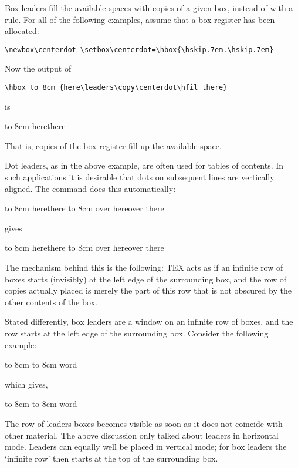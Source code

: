 Box leaders fill the available spaces with copies of a given box, instead of with a rule.
For all of the following examples, assume that a box register has been allocated:

\verb+\newbox\centerdot \setbox\centerdot=\hbox{\hskip.7em.\hskip.7em}+

Now the output of

\verb+\hbox to 8cm {here\leaders\copy\centerdot\hfil there}+

is

\hbox to 8cm {here\leaders\copy\centerdot\hfil there}

That is, copies of the box register fill up the available space.

Dot leaders, as in the above example, are often used for tables of contents. In such applications it
is desirable that dots on subsequent lines are vertically aligned. The  command does this
automatically:

\begin{teX}
\hbox to 8cm {here\leaders\copy\centerdot\hfil there}
\hbox to 8cm {over here\leaders\copy\centerdot\hfil over there}
\end{teX}

gives

\hbox to 8cm {here\leaders\copy\centerdot\hfil there}
\hbox to 8cm {over here\leaders\copy\centerdot\hfil over there}


The mechanism behind this is the following: TEX acts as if an infinite row of boxes starts (invisibly)
at the left edge of the surrounding box, and the row of copies actually placed is merely the part of
this row that is not obscured by the other contents of the box.

Stated differently, box leaders are a window on an infinite row of boxes, and the row starts at the
left edge of the surrounding box. Consider the following example:

\begin{teX}
\hbox to 8cm {\leaders\copy\centerdot\hfil}
\hbox to 8cm {word\leaders\copy\centerdot\hfil}
\end{teX}

which gives,

\hbox to 8cm {\leaders\copy\centerdot\hfil}
\hbox to 8cm {word\leaders\copy\centerdot\hfil}

The row of leaders boxes becomes visible as soon as it does not coincide with other material.
The above discussion only talked about leaders in horizontal mode. Leaders can equally well be
placed in vertical mode; for box leaders the ‘infinite row’ then starts at the top of the surrounding
box.


